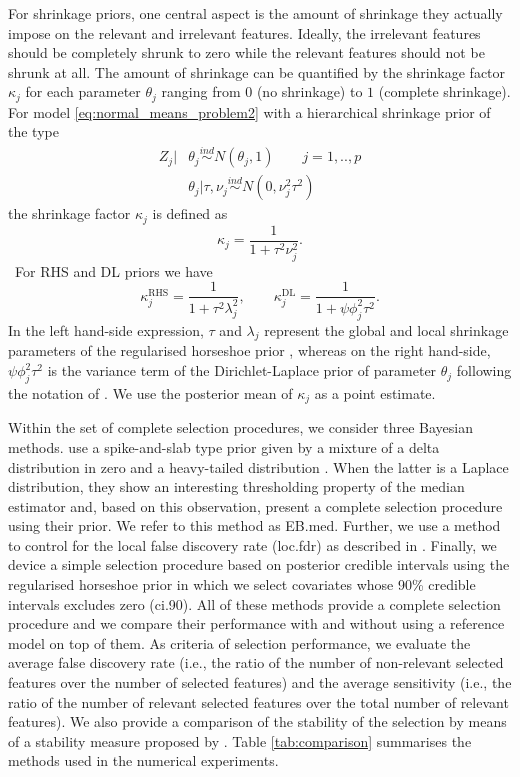 \documentclass[american,]{article}
\theoremstyle{definition}
\begin{document}
For shrinkage priors, one central aspect is the amount of shrinkage
they actually impose on the relevant and irrelevant features. Ideally,
the irrelevant features should be completely shrunk to zero while the
relevant features should not be shrunk at all. The amount of shrinkage
can be quantified by the shrinkage factor $\kappa_{j}$ for each
parameter $\theta_{j}$ ranging from $0$ (no shrinkage) to $1$
(complete shrinkage). For model \eqref{eq:normal_means_problem2} with
a hierarchical shrinkage prior of the type
\begin{align}
Z_{j}|&\theta_{j}\overset{ind}{\sim}N(\theta_{j},1) \qquad j=1,..,p \\
&\theta_{j}|\tau,\nu_{j}\overset{ind}{\sim}N(0,\nu_{j}^{2}\tau^{2})
\end{align}
the shrinkage factor $\kappa_{j}$ is defined as
\begin{equation}
\kappa_{j}=\frac{1}{1+\tau^{2}\nu_{j}^{2}}.
\end{equation}
\
For RHS and DL priors we have
\begin{equation}
\kappa_{j}^{\text{RHS}}=\frac{1}{1+\tau^{2}\lambda_{j}^{2}}, \qquad \kappa_{j}^{\text{DL}}=\frac{1}{1+\psi\phi_{j}^{2}\tau^{2}}.
\end{equation}
In the left hand-side expression, $\tau$ and $\lambda_{j}$ represent
the global and local shrinkage parameters of the regularised horseshoe
prior \cite[for further details see][]{paper:rhs}, whereas on the
right hand-side, $\psi\phi_{j}^{2}\tau^{2}$ is the variance term of
the Dirichlet-Laplace prior of parameter $\theta_{j}$ following the
notation of \cite{paper:dirichlet_laplace}. We use the posterior mean
of $\kappa_{j}$ as a point estimate.

Within the set of complete selection procedures, we consider three
Bayesian methods.  \cite{johnstone2004needles} use a spike-and-slab
type prior given by a mixture of a delta distribution in zero and a
heavy-tailed distribution \cite[see
also][]{paper:spike_slab_mitchell}. When the latter is a Laplace
distribution, they show an interesting thresholding property of the
median estimator and, based on this observation, present a complete
selection procedure using their prior. We refer to this method as
EB.med. Further, we use a method to control for the local false
discovery rate (loc.fdr) as described in \cite{paper:efron,
  efron2012large}. Finally, we device a simple selection procedure
based on posterior credible intervals using the regularised horseshoe
prior in which we select covariates whose 90\% credible intervals
excludes zero (ci.90). All of these methods provide a complete
selection procedure and we compare their performance with and without
using a reference model on top of them. As criteria of selection
performance, we evaluate the average false discovery rate (i.e., the
ratio of the number of non-relevant selected features over the number
of selected features) and the average sensitivity (i.e., the ratio of
the number of relevant selected features over the total number of
relevant features). We also provide a comparison of the stability of
the selection by means of a stability measure proposed by
\cite{paper:stability}. Table \ref{tab:comparison} summarises the
methods used in the numerical experiments.
\end{document}

